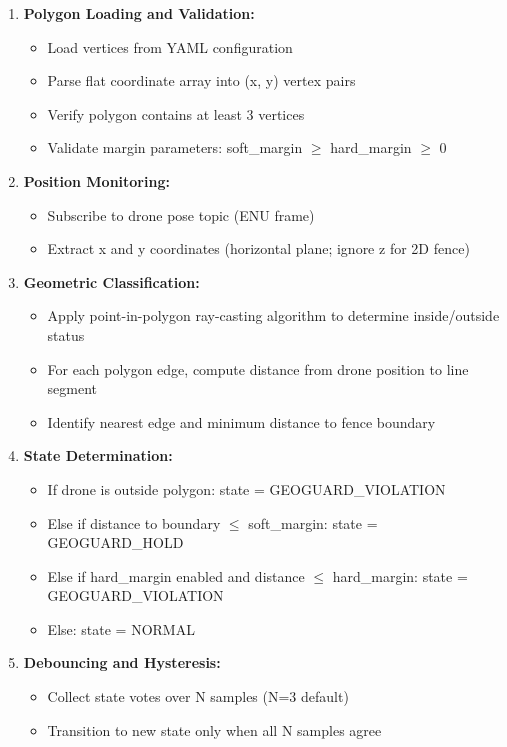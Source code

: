 \documentclass[12pt,a4paper]{report}
\begin{document}
\begin{enumerate}
    \item \textbf{Polygon Loading and Validation:}
    \begin{itemize}
        \item Load vertices from YAML configuration
        \item Parse flat coordinate array into (x, y) vertex pairs
        \item Verify polygon contains at least 3 vertices
        \item Validate margin parameters: soft\_margin $\geq$ hard\_margin $\geq$ 0
    \end{itemize}
    \item \textbf{Position Monitoring:}
    \begin{itemize}
        \item Subscribe to drone pose topic (\ac{ENU} frame)
        \item Extract x and y coordinates (horizontal plane; ignore z for 2D fence)
    \end{itemize}
    \item \textbf{Geometric Classification:}
    \begin{itemize}
        \item Apply point-in-polygon ray-casting algorithm to determine inside/outside status
        \item For each polygon edge, compute distance from drone position to line segment
        \item Identify nearest edge and minimum distance to fence boundary
    \end{itemize}
    \item \textbf{State Determination:}
    \begin{itemize}
        \item If drone is outside polygon: state = GEOGUARD\_VIOLATION
        \item Else if distance to boundary $\leq$ soft\_margin: state = GEOGUARD\_HOLD
        \item Else if hard\_margin enabled and distance $\leq$ hard\_margin: state = GEOGUARD\_VIOLATION
        \item Else: state = NORMAL
    \end{itemize}
    \item \textbf{Debouncing and Hysteresis:}
    \begin{itemize}
        \item Collect state votes over N samples (N=3 default)
        \item Transition to new state only when all N samples agree

\end{itemize}
\end{enumerate}
\end{document}

